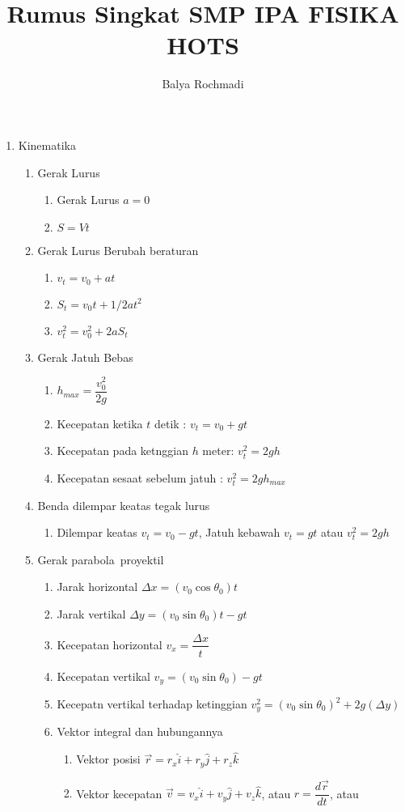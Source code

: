 \documentclass[12pt,a4paper,draft,final,oneside,twoside,twocoloumn,openright,openany]{article}
\author{Balya Rochmadi}
\title{Rumus Singkat SMP IPA FISIKA HOTS}
\begin{document}
	\begin{enumerate}
		\item Kinematika
		\begin{enumerate}
			\item Gerak Lurus
				\begin{enumerate}
					\item Gerak Lurus $a=0$
					\item $S=Vt$
				\end{enumerate}
			\item Gerak Lurus Berubah beraturan
				\begin{enumerate}
					\item $v_t=v_0+at$
					\item $S_t=v_0t+1/2at^2$
					\item $v_t^2=v_0^2+2aS_t$
				\end{enumerate}
			\item Gerak Jatuh Bebas
				\begin{enumerate}
					\item $h_{max}=\dfrac{v_0^2}{2g}$
					\item Kecepatan ketika $t$ detik : $v_t=v_0+gt$
					\item Kecepatan pada ketnggian $h$ meter: $v_t^2=2gh$
					\item Kecepatan sesaat sebelum jatuh : $v_t^2=2gh_{max}$
				\end{enumerate}
			\item Benda dilempar keatas tegak lurus
				\begin{enumerate}
					\item Dilempar keatas $v_t=v_0-gt$, Jatuh kebawah $v_t=gt$ atau $v_t^2=2gh$
				\end{enumerate}
			\item Gerak parabola\ proyektil
				\begin{enumerate}
					\item Jarak horizontal $\Delta x=(v_0 \cos{\theta_0})t$
					\item Jarak vertikal $\Delta y= (v_0 \sin{\theta_0})t-gt$
					\item Kecepatan horizontal $v_x=\dfrac{\Delta x}{t}$
					\item Kecepatan vertikal $v_y=(v_0 \sin{\theta_0})-gt$
					\item Kecepatn vertikal terhadap ketinggian $v_y^2=(v_0 \sin{\theta_0})^2+2g(\Delta y)$
			\item Vektor integral dan hubungannya
				\begin{enumerate}
					\item Vektor posisi $\vec{r}=r_x\hat{i}+r_y\hat{j}+r_z\hat{k}$
					\item Vektor kecepatan $\vec{v}=v_x\hat{i}+v_y\hat{j}+v_z\hat{k}$, atau $r=\dfrac{d\vec{r}}{dt}$, atau $  $
				\end{enumerate}
				\end{enumerate}
		\end{enumerate}
	\end{enumerate}
\end{document}
